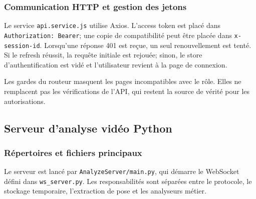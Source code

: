 \documentclass[11pt,a4paper]{article}
\newcommand{\code}[1]{\nolinkurl{#1}}
\begin{document}
\subsubsection{Communication HTTP et gestion des jetons}

Le service \code{api.service.js} utilise Axios. L'access token est placé dans \code{Authorization: Bearer}; une copie de compatibilité peut être placée dans \code{x-session-id}. Lorsqu'une réponse 401 est reçue, un seul renouvellement est tenté. Si le refresh réussit, la requête initiale est rejouée; sinon, le store d'authentification est vidé et l'utilisateur revient à la page de connexion.

Les gardes du routeur masquent les pages incompatibles avec le rôle. Elles ne remplacent pas les vérifications de l'API, qui restent la source de vérité pour les autorisations.

\subsection{Serveur d'analyse vidéo Python}

\subsubsection{Répertoires et fichiers principaux}

Le serveur est lancé par \code{AnalyzeServer/main.py}, qui démarre le WebSocket défini dans \code{ws_server.py}. Les responsabilités sont séparées entre le protocole, le stockage temporaire, l'extraction de pose et les analyseurs métier.
\end{document}
